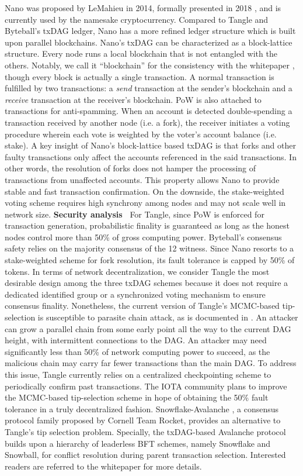 {Nano was proposed by LeMahieu in 2014, formally presented in 2018 , and is currently used by the namesake cryptocurrency. Compared to Tangle and Byteball's txDAG ledger, Nano has a more refined ledger structure which is built upon parallel blockchains. Nano's txDAG can be characterized as a block-lattice structure. Every node runs a local blockchain that is not entangled with the others. Notably, we call it ``blockchain'' for the consistency with the whitepaper , though every block is actually a single transaction. A normal transaction is fulfilled by two transactions: a \emph{send} transaction at the sender's blockchain and a \emph{receive} transaction at the receiver's blockchain. PoW is also attached to transactions for anti-spamming. When an account is detected double-spending a transaction received by another node (i.e. a fork), the receiver initiates a voting procedure wherein each vote is weighted by the voter's account balance (i.e. stake). 
A key insight of Nano's block-lattice based txDAG is that forks and other faulty transactions only affect the accounts referenced in the said transactions. In other words, the resolution of forks does not hamper the processing of transactions from unaffected accounts. This property allows Nano to provide stable and fast transaction confirmation. On the downside, the stake-weighted voting scheme requires high synchrony among nodes and may not scale well in network size.
}
\textbf{Security analysis~} 
For Tangle, since PoW is enforced for transaction generation, probabilistic finality is guaranteed as long as the honest nodes control more than 50\% of gross computing power. Byteball's consensus safety relies on the majority consensus of the 12 witness. Since Nano resorts to a stake-weighted scheme for fork resolution, its fault tolerance is capped by 50\% of tokens.
In terms of network decentralization, we consider Tangle the most desirable design among the three txDAG schemes because it does not require a dedicated identified group or a synchronized voting mechanism to ensure consensus finality.
Nonetheless, the current version of Tangle's MCMC-based tip-selection is susceptible to parasite chain attack, as is documented in . An attacker can grow a parallel chain from some early point all the way to the current DAG height, with intermittent connections to the DAG. An attacker may need significantly less than 50\% of network computing power to succeed, as the malicious chain may carry far fewer transactions than the main DAG. To address this issue, Tangle currently relies on a centralized checkpointing scheme to periodically confirm past transactions. The IOTA community plans to improve the MCMC-based tip-selection scheme in hope of obtaining the 50\% fault tolerance in a truly decentralized fashion. 
Snowflake-Avalanche , a consensus protocol family proposed by Cornell Team Rocket, provides an alternative to Tangle's tip selection problem. Specially, the txDAG-based Avalanche protocol builds upon a hierarchy of leaderless BFT schemes, namely Snowflake and Snowball, for conflict resolution during parent transaction selection. Interested readers are referred to the whitepaper  for more details.

